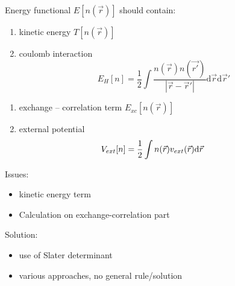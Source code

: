 \documentclass[slovene, usenames,dvipsnames]{beamer}
\newcommand{\dif}{\mathrm{d}}
\begin{document}
  \begin{frame}{Energy functional}
    \centering $E[n(\vec r)]$ should contain:
\\    
    \begin{minipage}[t]{0.45\textwidth}
      \begin{enumerate}[$\ast$]
      \item kinetic energy $T[n(\vec r)]$
      \item coulomb interaction
        \begin{equation}\nonumber
             E_H[n] = \frac{1}{2}\int \frac{n(\vec r)n(\vec {r'})}{|\vec r - \vec r'|} \dif \vec r  \dif \vec r'
        \end{equation}
      \end{enumerate}
    \end{minipage}%
    \begin{minipage}[t]{0.55\textwidth}
      \begin{enumerate}[$\ast$]
      \item exchange -- correlation term $E_{xc}[n(\vec r)]$
      \item external potential
        \begin{equation}\nonumber
          \hspace{-1cm}
          V_{ext}[n] = \frac{1}{2}\int n(\vec r) v_{ext}(\vec r)\dif \vec r
      \end{equation}
    \end{enumerate}
    \vspace{0.2cm}
  \end{minipage}
  
  \begin{minipage}[]{0.5\textwidth}
    Issues:
    \begin{itemize}
    \item kinetic energy term
    \item  Calculation on exchange-correlation part
      \end{itemize}
    \end{minipage}%
      \begin{minipage}[]{0.5\textwidth}
    Solution:
    \begin{itemize}
    \item use of Slater determinant
    \item  various approaches, no general rule/solution
      \end{itemize}
    \end{minipage}
  \end{frame}
\end{document}
